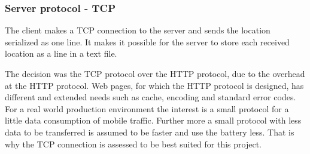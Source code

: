 \subsubsection{Server protocol - TCP}
The client makes a TCP connection to the server and sends the location serialized as one line. It makes it possible for the server to store each received location as a line in a text file.

The decision was the TCP protocol over the HTTP protocol, due to the overhead at the HTTP protocol. Web pages, for which the HTTP protocol is designed, has different and extended needs such as cache, encoding and standard error codes. For a real world production environment the interest is a small protocol for a little data consumption of mobile traffic. Further more a small protocol with less data to be transferred is assumed to be faster and use the battery less. That is why the TCP connection is assessed to be best suited for this project.